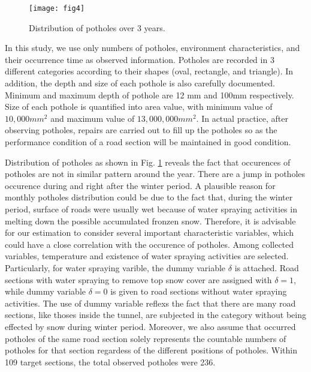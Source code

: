 \documentclass[a4paper,oneside,onecolumn,preprint,10pt,authoryear]{elsarticle}
\begin{document}
\begin{figure}[t]
\begin{center}
\begin{footnotesize}
\texttt{[image: fig4]}\\
\end{footnotesize}
\end{center}
\caption{Distribution of potholes over 3 years.}
\label{fig4}
\end{figure}

In this study, we use only numbers of potholes, environment characteristics, and their occurrence time as observed information. Potholes are recorded in 3 different categories according to their shapes (oval, rectangle, and triangle). In addition, the depth and size of each pothole is also carefully documented. Minimum and maximum depth of pothole are 12 mm and 100mm respectively. Size of each pothole is quantified into area value, with minimum value of $10,000mm^2$ and maximum value of $13,000,000mm^2$. In actual practice, after observing potholes, repairs are carried out to fill up the potholes so as the performance condition of a road section will be maintained in good condition. 

Distribution of potholes as shown in Fig. \ref{fig4} reveals the fact that occurences of potholes are not in similar pattern around the year. There are a jump in potholes occurence during and right after the winter period. A plausible reason for monthly potholes distribution could be due to the fact that, during the winter period, surface of roads were usually wet because of water spraying activities in melting down the possible accumulated fronzen snow. Therefore, it is advisable for our estimation to consider several important characteristic variables, which could have a close correlation with the occurence of potholes. Among collected variables, temperature and existence of water spraying activities are selected. Particularly, for water spraying varible, the dummy variable $\delta$ is attached. Road sections with water spraying to remove top snow cover are assigned with $\delta=1$, while dummy variable $\delta=0$ is given to road sections without water spraying activities. The use of dummy variable reflexs the fact that there are many road sections, like thoses inside the tunnel, are subjected in the category without being effected by snow during winter period. Moreover, we also assume that occurred potholes of the same road section solely represents the countable numbers of potholes for that section regardess of the different positions of potholes. Within 109 target sections, the total observed potholes were 236.
\end{document}
